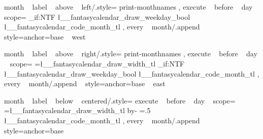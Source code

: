 \tikzset
  {
    month ~ label ~ above ~ left/.style=
      {
        print-monthnames ,
        execute ~ before ~ day ~ scope=
          {
              {
                {
                  \bool_if:NTF \l__fantasycalendar_draw_weekday_bool
                    {  }
                    {  }
                  \l__fantasycalendar_code_month_tl%
                }
              } 
          }
        ,
        every ~ month/.append ~ style={anchor=base ~ west}
      }
  }



\tikzset
  {
    month ~ label ~ above ~ right/.style=
      {
        print-monthnames ,
        execute ~ before ~ day ~ scope=
          {
              {
                {
                  \pgf@xb=\l__fantasycalendar_draw_width_tl\pgf@xa%
                  \pgftransformxshift{\pgf@xb}
                  \bool_if:NTF \l__fantasycalendar_draw_weekday_bool
                    {  }
                    {  }
                  \l__fantasycalendar_code_month_tl%
                }
              } 
          }
        ,
        every ~ month/.append ~ style={anchor=base ~ east}
      }
  }

\tikzset
  {
    month ~ label ~ below ~ centered/.style=
      {
        execute ~ before ~ day ~ scope=
          {
              {
                {
                  \pgf@xb=\l__fantasycalendar_draw_width_tl\pgf@xa%
                  \advance\pgf@xb by-\pgf@xa%
                  \pgf@xb=.5\pgf@xb%
                  \pgftransformxshift{\pgf@xb}
                  \pgftransformxshift{-1.5ex}
                  \l__fantasycalendar_code_month_tl%
                }
              } 
          }
        ,
        every ~ month/.append ~ style={anchor=base}
      }
  }

